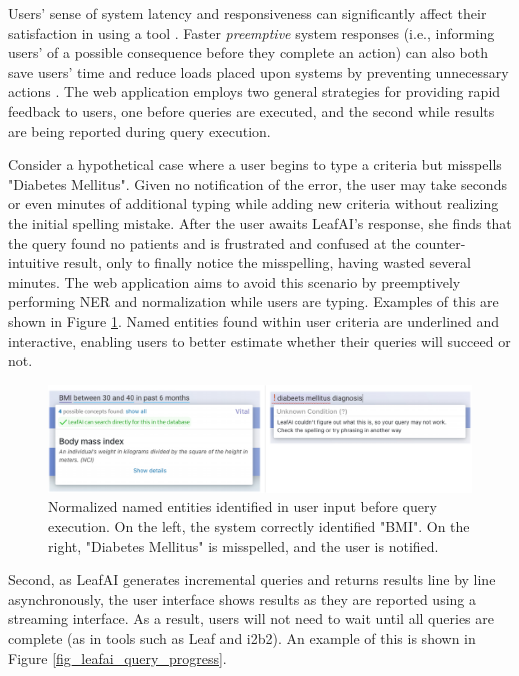 \documentclass[../main.tex]{subfiles}
\begin{document}
Users' sense of system latency and responsiveness can significantly affect their satisfaction in using a tool \cite{li2019effects, arapakis2014impact, shneiderman1984response}. Faster \textit{preemptive} system responses (i.e., informing users' of a possible consequence before they complete an action) can also both save users' time and reduce loads placed upon systems by preventing unnecessary actions \cite{lempel2003predictive, diaz2016search}. The web application employs two general strategies for providing rapid feedback to users, one before queries are executed, and the second while results are being reported during query execution.

Consider a hypothetical case where a user begins to type a criteria but misspells "Diabetes Mellitus". Given no notification of the error, the user may take seconds or even minutes of additional typing while adding new criteria without realizing the initial spelling mistake. After the user awaits LeafAI's response, she finds that the query found no patients and is frustrated and confused at the counter-intuitive result, only to finally notice the misspelling, having wasted several minutes. The web application aims to avoid this scenario by preemptively performing NER and normalization while users are typing. Examples of this are shown in Figure \ref{fig_leafai_mouse_hover}. Named entities found within user criteria are underlined and interactive, enabling users to better estimate whether their queries will succeed or not.

\begin{figure}[H]
  \centering
  \includegraphics[scale=0.55]{Figures/8_web_application/leafai_normalization.pdf}  
  \caption{Normalized named entities identified in user input before query execution. On the left, the system correctly identified "BMI". On the right, "Diabetes Mellitus" is misspelled, and the user is notified.}
\label{fig_leafai_mouse_hover}
\end{figure}

Second, as LeafAI generates incremental queries and returns results line by line asynchronously, the user interface shows results as they are reported using a streaming interface. As a result, users will not need to wait until all queries are complete (as in tools such as Leaf and i2b2). An example of this is shown in Figure \ref{fig_leafai_query_progress}.
\end{document}
